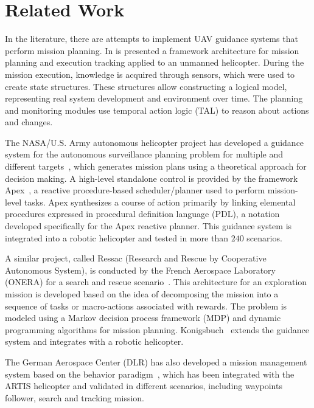 \documentclass[conference]{IEEEtran}
\begin{document}
\section{Related Work}
\label{sec:related}
In the literature, there are attempts to implement UAV guidance systems that perform mission planning. In \cite{doherty2009temporal} is presented a framework architecture for mission planning and execution tracking applied to an unmanned helicopter. During the mission execution, knowledge is acquired through sensors, which were used to create state structures. These structures allow constructing a logical model, representing real system development and environment over time. The planning and monitoring modules use temporal action logic (TAL) to reason about actions and changes.

The NASA/U.S. Army autonomous helicopter project has developed a guidance system for the autonomous surveillance planning problem for multiple and different targets~\cite{whalley2005design}, which generates mission plans using a theoretical approach for decision making. A high-level standalone control is provided by the framework Apex~\cite{baer1998nasa}, a reactive procedure-based scheduler/planner used to perform mission-level tasks. Apex synthesizes a course of action primarily by linking elemental procedures expressed in procedural definition language (PDL), a notation developed specifically for the Apex reactive planner. This guidance system is integrated into a robotic helicopter and tested in more than $240$ scenarios.

A similar project, called Ressac (Research and Rescue by Cooperative Autonomous System), is conducted by the French Aerospace Laboratory (ONERA) for a search and rescue scenario~\cite{fabiani2007autonomous}. This architecture for an exploration mission is developed based on the idea of decomposing the mission into a sequence of tasks or macro-actions associated with rewards. The problem is modeled using a Markov decision process framework (MDP) and dynamic programming algorithms for mission planning. Konigsbuch~\cite{teichteil2007multi} extends the guidance system and integrates with a robotic helicopter.

The German Aerospace Center (DLR) has also developed a mission management system based on the behavior paradigm~\cite{adolf2010onboard}, which has been integrated with the ARTIS helicopter and validated in different scenarios, including waypoints follower, search and tracking mission.
\end{document}
